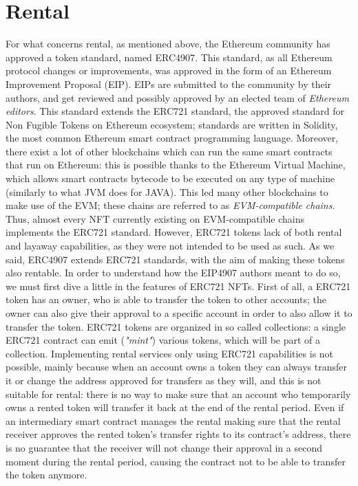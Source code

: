 \documentclass[english, LaM, oneside]{sapthesis}%
\begin{document}
\section{Rental}
\label{sec:caso}
For what concerns rental, as mentioned above, the Ethereum community has approved a token standard, named ERC4907\cite{ref:EIP4907}. This standard, as all Ethereum protocol changes or improvements, was approved in the form of an Ethereum Improvement Proposal (EIP). EIPs are submitted to the community by their authors, and get reviewed and possibly approved by an elected team of \textit{Ethereum editors}.\newline
This standard extends the ERC721 standard, the approved standard for Non Fugible Tokens on Ethereum ecosystem; standards are written in Solidity, the most common Ethereum smart contract programming language. Moreover, there exist a lot of other blockchains which can run the same smart contracts that run on Ethereum: this is possible thanks to the Ethereum Virtual Machine, which allows smart contracts bytecode to be executed on any type of machine (similarly to what JVM does for JAVA). This led many other blockchains to make use of the EVM; these chains are referred to as \textit{EVM-compatible chains}.
Thus, almost every NFT currently existing on EVM-compatible chains implements the ERC721 standard. However, ERC721 tokens lack of both rental and layaway capabilities, as they were not intended to be used as such.
As we said, ERC4907 extends ERC721 standards, with the aim of making these tokens also rentable.\newline
In order to understand how the EIP4907 authors meant to do so, we must first dive a little in the features of ERC721 NFTs. First of all, a ERC721 token has an owner, who is able to transfer the token to other accounts; the owner can also give their approval to a specific account in order to also allow it to transfer the token. ERC721 tokens are organized in so called collections: a single ERC721 contract can emit (\textit{"mint"}) various tokens, which will be part of a collection. Implementing rental services only using ERC721 capabilities is not possible, mainly because when an account owns a token they can always transfer it or change the address approved for transfers as they will, and this is not suitable for rental: there is no way to make sure that an account who temporarily owns a rented token will transfer it back at the end of the rental period. Even if an intermediary smart contract manages the rental making sure that the rental receiver approves the rented token's transfer rights to its contract's address, there is no guarantee that the receiver will not change their approval in a second moment during the rental period, causing the contract not to be able to transfer the token anymore.\newline
\end{document}
